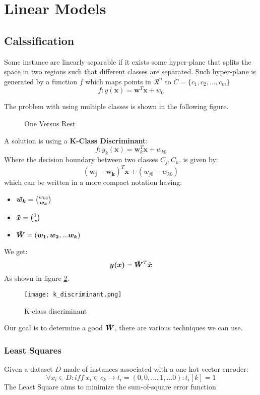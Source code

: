 
\section{Linear Models}

\subsection{Calssification}
Some instance are linearly separable if it exists some hyper-plane that splits the space in two regions such that different classes are separated. Such hyper-plane is generated by a function $f$ which maps points in $\mathcal{R}^n$ to $C=\lbrace c_1,c_2,...,c_m\rbrace$
\[f: y(\bm{x})=\bm{w}^T\bm{x}+w_0\]


The problem with using multiple classes is shown in the following figure.


\begin{figure}[H]
    \centering
    \qquad

\caption{One Versus Rest }
\label{fig:linear_problem}

\end{figure}


A solution is using a \textbf{K-Class Discriminant}:
\[f: y_k(\bm{x})=\bm{w}_k^T\bm{x}+w_{k0}\]
Where the decision boundary between two classes $C_j,C_k$, is given by:
\[(\bm{w_j}-\bm{w_k})^T\bm{x}+(w_{j0}-w_{k0})\]
which can be written in a more compact notation having:
\begin{itemize}
\item $\bm{\tilde{w_k}}=\binom{w_{k0}}{\bm{w_k}}$
\item $\bm{\tilde{x}}=\binom{1}{\bm{x}}$
\item $\bm{\tilde{W}}=(\bm{w_1},\bm{w_2},...\bm{w_k})$
\end{itemize}
We get:
\[\bm{y(x)}=\bm{\tilde{W}}^T\bm{\tilde{x}}\]
As shown in figure \ref{fig:k_discriminant}.

\begin{figure}[H]
\texttt{[image: k\_discriminant.png]}
\caption{K-class discriminant}
\label{fig:k_discriminant}
\end{figure}

Our goal is to determine a good $\bm{\tilde{W}}$, there are various techniques we can use.

\subsubsection{Least Squares}
Given a dataset $D$ made of instances associated with a one hot vector encoder:
\[\forall x_i \in D: iff\ x_i \in c_k \rightarrow t_i=(0,0,...,1,...0): t_i[k]=1\]
The Least Square aims to minimize the sum-of-square error function


